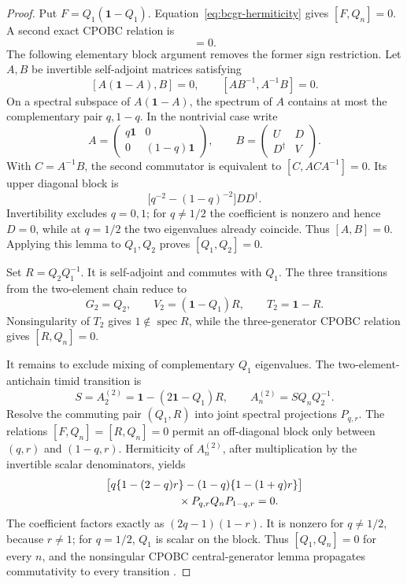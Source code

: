 \begin{proof}
Put \(F=Q_1(\mathbf1-Q_1)\).  Equation~\eqref{eq:bcgr-hermiticity}
gives \([F,Q_n]=0\).  A second exact CPOBC relation is
\begin{equation}
 [Q_1Q_2^{-1},Q_1^{-1}Q_2]=0.
\label{eq:bcgr-q1q2}
\end{equation}
The following elementary block argument removes the former sign
restriction.  Let \(A,B\) be invertible self-adjoint matrices satisfying
\[
 [A(\mathbf1-A),B]=0,\qquad [AB^{-1},A^{-1}B]=0 .
\]
On a spectral subspace of \(A(\mathbf1-A)\), the spectrum of \(A\) contains
at most the complementary pair \(q,1-q\).  In the nontrivial case write
\[
 A=\begin{pmatrix}q\mathbf1&0\\0&(1-q)\mathbf1\end{pmatrix},
 \qquad
 B=\begin{pmatrix}U&D\\D^\dagger&V\end{pmatrix}.
\]
With \(C=A^{-1}B\), the second commutator is equivalent to
\([C,ACA^{-1}]=0\).  Its upper diagonal block is
\[
 \bigl[q^{-2}-(1-q)^{-2}\bigr]DD^\dagger .
\]
Invertibility excludes \(q=0,1\); for \(q\ne1/2\) the coefficient is
nonzero and hence \(D=0\), while at \(q=1/2\) the two eigenvalues already
coincide.  Thus \([A,B]=0\).  Applying this lemma to \(Q_1,Q_2\) proves
\([Q_1,Q_2]=0\).

Set \(R=Q_2Q_1^{-1}\).  It is self-adjoint and commutes with \(Q_1\).
The three transitions from the two-element chain reduce to
\begin{equation}
 G_2=Q_2,\qquad
 V_2=(\mathbf1-Q_1)R,\qquad
 T_2=\mathbf1-R .
\label{eq:bcgr-chain}
\end{equation}
Nonsingularity of \(T_2\) gives \(1\notin\operatorname{spec}R\), while the
three-generator CPOBC relation gives \([R,Q_n]=0\).

It remains to exclude mixing of complementary \(Q_1\) eigenvalues.  The
two-element-antichain timid transition is
\[
 S=A_2^{(2)}=\mathbf1-(2\mathbf1-Q_1)R,
 \qquad
 A_n^{(2)}=S Q_nQ_2^{-1}.
\]
Resolve the commuting pair \((Q_1,R)\) into joint spectral projections
\(P_{q,r}\).  The relations \([F,Q_n]=[R,Q_n]=0\) permit an off-diagonal
block only between \((q,r)\) and \((1-q,r)\).  Hermiticity of
\(A_n^{(2)}\), after multiplication by the invertible scalar denominators,
yields
\begin{align}
 &\bigl[q\{1-(2-q)r\}
 -(1-q)\{1-(1+q)r\}\bigr]\nonumber\\
 &\hspace{23mm}\times
 P_{q,r}Q_nP_{1-q,r}=0 .
\label{eq:bcgr-separator}
\end{align}
The coefficient factors exactly as
\((2q-1)(1-r)\).  It is nonzero for \(q\ne1/2\), because \(r\ne1\);
for \(q=1/2\), \(Q_1\) is scalar on the block.  Thus
\([Q_1,Q_n]=0\) for every \(n\), and the nonsingular CPOBC
central-generator lemma propagates commutativity to every transition
\cite{SrivastavaSurya2026}.


\end{proof}
